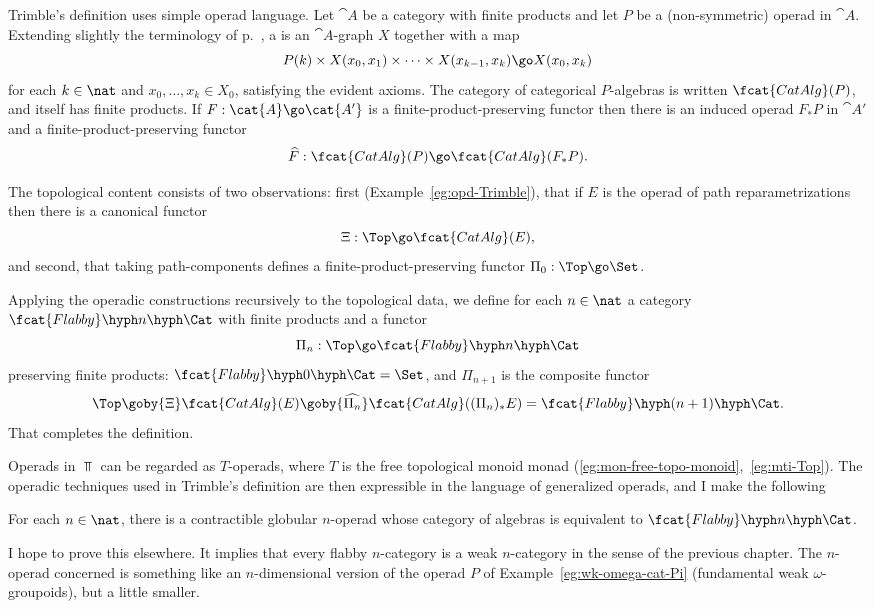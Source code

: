 Trimble's definition uses simple operad language.  Let $\cat{A}$ be a
category with finite products and let $P$ be a (non-symmetric) operad in
$\cat{A}$.  Extending slightly the terminology of
p.~\pageref{p:P-category}, a %
%
%
is an
$\cat{A}$-graph $X$ together with a map
%
\begin{equation}	\label{eq:cat-alg-action}
P(k) \times X(x_0, x_1) \times \cdots \times X(x_{k-1}, x_k)
\go 
X(x_0, x_k)
\end{equation}
%
for each $k\in\nat$ and $x_0, \ldots, x_k \in X_0$, satisfying the evident
axioms.  The category of categorical $P$-algebras is written
$\fcat{CatAlg}(P)$,%
% 
% 
and itself has finite products.  If $F: \cat{A} \go
\cat{A'}$ is a finite-product-preserving functor then there is an induced
operad $F_* P$ in $\cat{A'}$ and a finite-product-preserving functor
\[
\widehat{F}: 
\fcat{CatAlg}(P) \go \fcat{CatAlg}(F_* P).
\]
  
The topological content consists of two observations: first
(Example~\ref{eg:opd-Trimble}), that if $E$ is the operad of path%
%
%
reparametrizations then there is a canonical functor
\[
\Xi: \Top \go \fcat{CatAlg}(E),
\]
and second, that taking path-components defines a finite-product-preserving
functor $\Pi_0: \Top \go \Set$.

Applying the operadic constructions recursively to the topological data, we
define for each $n\in\nat$ a category $\fcat{Flabby}\hyph n\hyph\Cat$ with
finite products and a functor
\[
\Pi_n: \Top \go \fcat{Flabby}\hyph n\hyph\Cat 
\]%
% 
%
% 
preserving finite products: $\fcat{Flabby}\hyph 0\hyph\Cat = \Set$, and
$\Pi_{n+1}$ is the composite functor
\[
\Top 
\goby{\Xi} 
\fcat{CatAlg}(E) 
\goby{\widehat{\Pi_n}} 
\fcat{CatAlg}((\Pi_n)_* E)
=
\fcat{Flabby}\hyph (n+1)\hyph\Cat.
\]
That completes the definition.

Operads in $\Top$ can be regarded as $T$-operads, where $T$ is the free
topological%
%
%
monoid monad (\ref{eg:mon-free-topo-monoid},~\ref{eg:mti-Top}).
The operadic techniques used in Trimble's definition are then expressible
in the language of generalized operads, and I make the following
%
\begin{claim}
  For each $n\in\nat$, there is a contractible globular $n$-operad whose
  category of algebras is equivalent to $\fcat{Flabby}\hyph n\hyph\Cat$.
\end{claim}
%
I hope to prove this elsewhere.  It implies that every flabby $n$-category
is a weak $n$-category in the sense of the previous chapter.  The
$n$-operad concerned is something like an $n$-dimensional version of the
operad $P$ of Example~\ref{eg:wk-omega-cat-Pi} (fundamental weak
$\omega$-groupoids), but a little smaller.

